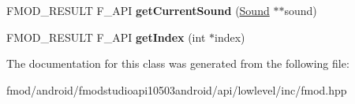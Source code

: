 \begin{DoxyCompactItemize}
\item 
\hypertarget{class_f_m_o_d_1_1_channel_af8c6cb4f1490eda077f4a661437a0809}{F\+M\+O\+D\+\_\+\+R\+E\+S\+U\+L\+T F\+\_\+\+A\+P\+I {\bfseries get\+Current\+Sound} (\hyperlink{class_f_m_o_d_1_1_sound}{Sound} $\ast$$\ast$sound)}\label{class_f_m_o_d_1_1_channel_af8c6cb4f1490eda077f4a661437a0809}

\item 
\hypertarget{class_f_m_o_d_1_1_channel_ad1d410d1d16d0c153dd0af5de8fda88e}{F\+M\+O\+D\+\_\+\+R\+E\+S\+U\+L\+T F\+\_\+\+A\+P\+I {\bfseries get\+Index} (int $\ast$index)}\label{class_f_m_o_d_1_1_channel_ad1d410d1d16d0c153dd0af5de8fda88e}

\end{DoxyCompactItemize}


The documentation for this class was generated from the following file\+:\begin{DoxyCompactItemize}
\item 
fmod/android/fmodstudioapi10503android/api/lowlevel/inc/fmod.\+hpp\end{DoxyCompactItemize}

